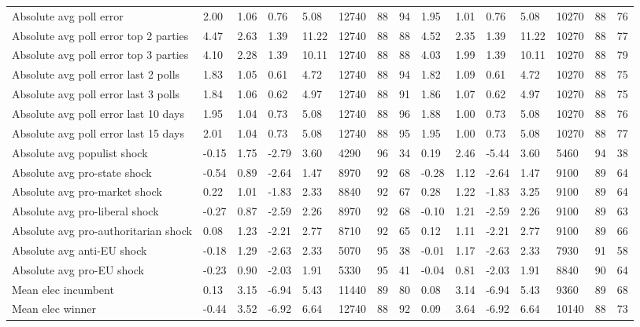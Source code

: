 \begin{longtable}{lllllllllllllll}
Absolute avg poll error & 2.00 & 1.06 & 0.76 & 5.08 & 12740 & 88 & 94 & 1.95 & 1.01 & 0.76 & 5.08 & 10270 & 88 & 76\\
Absolute avg poll error top 2 parties & 4.47 & 2.63 & 1.39 & 11.22 & 12740 & 88 & 88 & 4.52 & 2.35 & 1.39 & 11.22 & 10270 & 88 & 77\\
Absolute avg poll error top 3 parties & 4.10 & 2.28 & 1.39 & 10.11 & 12740 & 88 & 88 & 4.03 & 1.99 & 1.39 & 10.11 & 10270 & 88 & 79\\
\addlinespace
Absolute avg poll error last 2 polls & 1.83 & 1.05 & 0.61 & 4.72 & 12740 & 88 & 94 & 1.82 & 1.09 & 0.61 & 4.72 & 10270 & 88 & 75\\
Absolute avg poll error last 3 polls & 1.84 & 1.06 & 0.62 & 4.97 & 12740 & 88 & 91 & 1.86 & 1.07 & 0.62 & 4.97 & 10270 & 88 & 75\\
Absolute avg poll error last 10 days & 1.95 & 1.04 & 0.73 & 5.08 & 12740 & 88 & 96 & 1.88 & 1.00 & 0.73 & 5.08 & 10270 & 88 & 76\\
Absolute avg poll error last 15 days & 2.01 & 1.04 & 0.73 & 5.08 & 12740 & 88 & 95 & 1.95 & 1.00 & 0.73 & 5.08 & 10270 & 88 & 77\\
Absolute avg populist shock & -0.15 & 1.75 & -2.79 & 3.60 & 4290 & 96 & 34 & 0.19 & 2.46 & -5.44 & 3.60 & 5460 & 94 & 38\\
\addlinespace
Absolute avg pro-state shock & -0.54 & 0.89 & -2.64 & 1.47 & 8970 & 92 & 68 & -0.28 & 1.12 & -2.64 & 1.47 & 9100 & 89 & 64\\
Absolute avg pro-market shock & 0.22 & 1.01 & -1.83 & 2.33 & 8840 & 92 & 67 & 0.28 & 1.22 & -1.83 & 3.25 & 9100 & 89 & 64\\
Absolute avg pro-liberal shock & -0.27 & 0.87 & -2.59 & 2.26 & 8970 & 92 & 68 & -0.10 & 1.21 & -2.59 & 2.26 & 9100 & 89 & 63\\
Absolute avg pro-authoritarian shock & 0.08 & 1.23 & -2.21 & 2.77 & 8710 & 92 & 65 & 0.12 & 1.11 & -2.21 & 2.77 & 9100 & 89 & 66\\
Absolute avg anti-EU shock & -0.18 & 1.29 & -2.63 & 2.33 & 5070 & 95 & 38 & -0.01 & 1.17 & -2.63 & 2.33 & 7930 & 91 & 58\\
\addlinespace
Absolute avg pro-EU shock & -0.23 & 0.90 & -2.03 & 1.91 & 5330 & 95 & 41 & -0.04 & 0.81 & -2.03 & 1.91 & 8840 & 90 & 64\\
Mean elec incumbent & 0.13 & 3.15 & -6.94 & 5.43 & 11440 & 89 & 80 & 0.08 & 3.14 & -6.94 & 5.43 & 9360 & 89 & 68\\
Mean elec winner & -0.44 & 3.52 & -6.92 & 6.64 & 12740 & 88 & 92 & 0.09 & 3.64 & -6.92 & 6.64 & 10140 & 88 & 73\\

\end{longtable}
